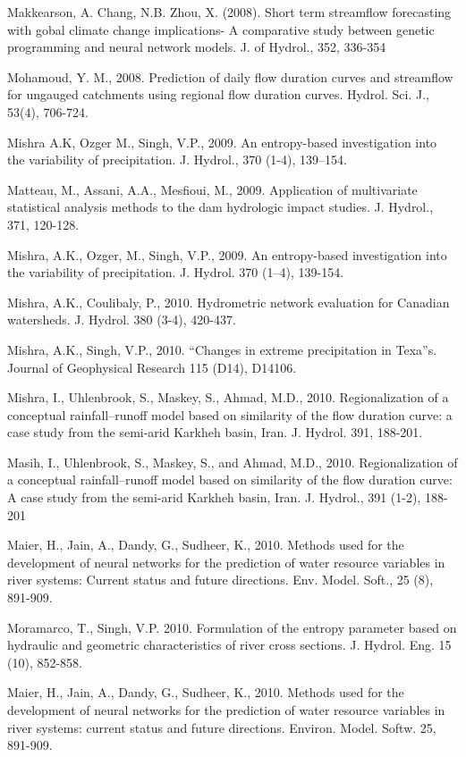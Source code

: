 \begin{hangingpar}{2em}
Makkearson, A. Chang, N.B. Zhou, X. (2008). Short term streamflow forecasting with gobal climate change implications- A comparative study between genetic programming and neural network models. J. of Hydrol., 352, 336-354

Mohamoud, Y. M., 2008. Prediction of daily flow duration curves and streamflow for ungauged catchments using regional flow duration curves. Hydrol. Sci. J., 53(4), 706-724.

Mishra A.K, Ozger M., Singh, V.P., 2009. An entropy-based investigation into the variability of precipitation. J. Hydrol., 370 (1-4), 139–154.

Matteau, M., Assani, A.A., Mesfioui, M., 2009. Application of multivariate statistical analysis methods to the dam hydrologic impact studies. J. Hydrol., 371, 120-128.

Mishra, A.K., Ozger, M., Singh, V.P., 2009. An entropy-based investigation into the variability of precipitation. J. Hydrol. 370 (1–4), 139-154.

Mishra, A.K., Coulibaly, P., 2010. Hydrometric network evaluation for Canadian watersheds. J. Hydrol. 380 (3-4), 420-437.

Mishra, A.K., Singh, V.P., 2010. ``Changes in extreme precipitation in Texa''s. Journal of Geophysical Research 115  (D14), D14106.

Mishra, I., Uhlenbrook, S., Maskey, S., Ahmad, M.D., 2010. Regionalization of a conceptual rainfall–runoff model based on similarity of the flow duration curve: a case study from the semi-arid Karkheh basin, Iran. J. Hydrol. 391, 188-201.

Masih, I., Uhlenbrook, S., Maskey, S., and Ahmad, M.D., 2010. Regionalization of a conceptual rainfall–runoff model based on similarity of the flow duration curve: A case study from the semi-arid Karkheh basin, Iran. J. Hydrol., 391 (1-2), 188-201

Maier, H., Jain, A., Dandy, G., Sudheer, K., 2010. Methods used for the development of neural networks for the prediction of water resource variables in river systems: Current status and future directions. Env. Model. Soft., 25 (8), 891-909.

Moramarco, T., Singh, V.P. 2010. Formulation of the entropy parameter based on hydraulic and geometric characteristics of river cross sections. J. Hydrol. Eng. 15 (10), 852-858. 

Maier, H., Jain, A., Dandy, G., Sudheer, K., 2010. Methods used for the development of neural networks for the prediction of water resource variables in river systems: current status and future directions. Environ. Model. Softw. 25, 891-909. 


\end{hangingpar}
